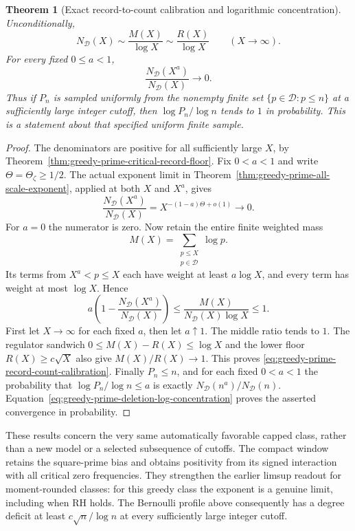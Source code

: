 \documentclass[11pt]{article}
\newtheorem{theorem}{Theorem}[section]
\theoremstyle{definition}
\begin{document}
\begin{theorem}[Exact record-to-count calibration and logarithmic concentration]
\label{thm:greedy-prime-record-count-calibration}
Unconditionally,
\begin{equation}
 N_{\mathcal D}(X)\sim\frac{M(X)}{\log X}
                  \sim\frac{R(X)}{\log X}\qquad(X\to\infty).
 \label{eq:greedy-prime-record-count-calibration}
\end{equation}
For every fixed $0\le a<1$,
\begin{equation}
               \frac{N_{\mathcal D}(X^a)}{N_{\mathcal D}(X)}
                                      \longrightarrow0.
 \label{eq:greedy-prime-deletion-log-concentration}
\end{equation}
Thus if $P_n$ is sampled uniformly from the nonempty finite set
$\{p\in\mathcal D:p\le n\}$ at a sufficiently large integer cutoff,
then $\log P_n/\log n$ tends to $1$ in probability.
This is a statement about that specified uniform finite sample.
\end{theorem}

\begin{proof}
The denominators are positive for all sufficiently large $X$,
by Theorem~\ref{thm:greedy-prime-critical-record-floor}.
Fix $0<a<1$ and write $\Theta=\Theta_\zeta\ge1/2$.
The actual exponent limit in
Theorem~\ref{thm:greedy-prime-all-scale-exponent}, applied at both
$X$ and $X^a$, gives
\[
 \frac{N_{\mathcal D}(X^a)}{N_{\mathcal D}(X)}
     =X^{-(1-a)\Theta+o(1)}\longrightarrow0.
\]
For $a=0$ the numerator is zero.
Now retain the entire finite weighted mass
\[
 M(X)=\sum_{\substack{p\le X\\p\in\mathcal D}}\log p .
\]
Its terms from $X^a<p\le X$ each have weight at least $a\log X$,
and every term has weight at most $\log X$. Hence
\[
 a\left(1-\frac{N_{\mathcal D}(X^a)}{N_{\mathcal D}(X)}\right)
 \le\frac{M(X)}{N_{\mathcal D}(X)\log X}\le1 .
\]
First let $X\to\infty$ for each fixed $a$, then let $a\uparrow1$.
The middle ratio tends to $1$.
The regulator sandwich $0\le M(X)-R(X)\le\log X$ and the lower
floor $R(X)\ge c\sqrt X$ also give $M(X)/R(X)\to1$.
This proves \eqref{eq:greedy-prime-record-count-calibration}.
Finally $P_n\le n$, and for each fixed $0<a<1$ the probability
that $\log P_n/\log n\le a$ is exactly
$N_{\mathcal D}(n^a)/N_{\mathcal D}(n)$.
Equation~\eqref{eq:greedy-prime-deletion-log-concentration} proves
the asserted convergence in probability.
\end{proof}

These results concern the very same automatically favorable capped class,
rather than a new model or a selected subsequence of cutoffs.
The compact window retains the square-prime bias and obtains positivity
from its signed interaction with all critical zero frequencies.
They strengthen the earlier limsup readout for moment-rounded classes:
for this greedy class the exponent is a genuine limit, including when RH
holds. The Bernoulli profile above consequently has a degree deficit
at least $c\sqrt n/\log n$ at every sufficiently large integer cutoff.
\end{document}

